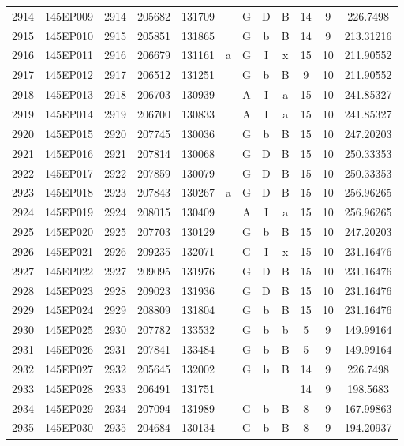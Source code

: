 \begin{tabular}{|*{12}{c|}}
2914 & 145EP009 & 2914 & 205682 & 131709 &  & G & D & B & 14 & 9 & 226.7498 \\ 
2915 & 145EP010 & 2915 & 205851 & 131865 &  & G & b & B & 14 & 9 & 213.31216 \\ 
2916 & 145EP011 & 2916 & 206679 & 131161 & a & G & I & x & 15 & 10 & 211.90552 \\ 
2917 & 145EP012 & 2917 & 206512 & 131251 &  & G & b & B & 9 & 10 & 211.90552 \\ 
2918 & 145EP013 & 2918 & 206703 & 130939 &  & A & I & a & 15 & 10 & 241.85327 \\ 
2919 & 145EP014 & 2919 & 206700 & 130833 &  & A & I & a & 15 & 10 & 241.85327 \\ 
2920 & 145EP015 & 2920 & 207745 & 130036 &  & G & b & B & 15 & 10 & 247.20203 \\ 
2921 & 145EP016 & 2921 & 207814 & 130068 &  & G & D & B & 15 & 10 & 250.33353 \\ 
2922 & 145EP017 & 2922 & 207859 & 130079 &  & G & D & B & 15 & 10 & 250.33353 \\ 
2923 & 145EP018 & 2923 & 207843 & 130267 & a & G & D & B & 15 & 10 & 256.96265 \\ 
2924 & 145EP019 & 2924 & 208015 & 130409 &  & A & I & a & 15 & 10 & 256.96265 \\ 
2925 & 145EP020 & 2925 & 207703 & 130129 &  & G & b & B & 15 & 10 & 247.20203 \\ 
2926 & 145EP021 & 2926 & 209235 & 132071 &  & G & I & x & 15 & 10 & 231.16476 \\ 
2927 & 145EP022 & 2927 & 209095 & 131976 &  & G & D & B & 15 & 10 & 231.16476 \\ 
2928 & 145EP023 & 2928 & 209023 & 131936 &  & G & D & B & 15 & 10 & 231.16476 \\ 
2929 & 145EP024 & 2929 & 208809 & 131804 &  & G & b & B & 15 & 10 & 231.16476 \\ 
2930 & 145EP025 & 2930 & 207782 & 133532 &  & G & b & b & 5 & 9 & 149.99164 \\ 
2931 & 145EP026 & 2931 & 207841 & 133484 &  & G & b & B & 5 & 9 & 149.99164 \\ 
2932 & 145EP027 & 2932 & 205645 & 132002 &  & G & b & B & 14 & 9 & 226.7498 \\ 
2933 & 145EP028 & 2933 & 206491 & 131751 &  &  &  &  & 14 & 9 & 198.5683 \\ 
2934 & 145EP029 & 2934 & 207094 & 131989 &  & G & b & B & 8 & 9 & 167.99863 \\ 
2935 & 145EP030 & 2935 & 204684 & 130134 &  & G & b & B & 8 & 9 & 194.20937 \\ 

\end{tabular}
